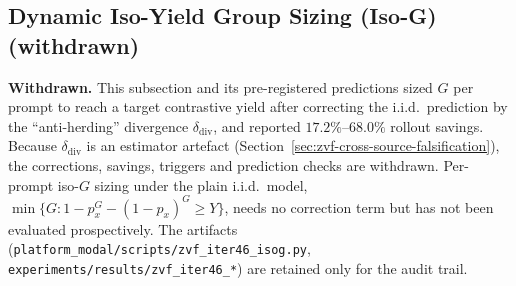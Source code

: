 
\subsection{Dynamic Iso-Yield Group Sizing (Iso-G) (withdrawn)}
\label{sec:zvf-isog}
\label{tab:zvf-isog-savings}
\label{sec:zvf-isog-predictions}
\label{tab:zvf-isog-preds}
\label{sec:zvf-isog-repro}
\textbf{Withdrawn.} This subsection and its pre-registered predictions sized $G$
per prompt to reach a target contrastive yield after correcting the i.i.d.\
prediction by the ``anti-herding'' divergence $\delta_{\mathrm{div}}$, and reported
$17.2\%$--$68.0\%$ rollout savings. Because $\delta_{\mathrm{div}}$ is an estimator
artefact (Section~\ref{sec:zvf-cross-source-falsification}), the corrections,
savings, triggers and prediction checks are withdrawn. Per-prompt iso-$G$ sizing
under the plain i.i.d.\ model, $\min\{G: 1-p_x^G-(1-p_x)^G \ge Y\}$, needs no
correction term but has not been evaluated prospectively. The artifacts
(\texttt{platform\_modal/scripts/zvf\_iter46\_isog.py},
\texttt{experiments/results/zvf\_iter46\_*}) are retained only for the audit
trail.
